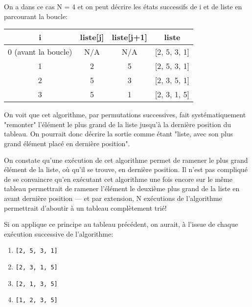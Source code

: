 \documentclass[12pt]{article}
\begin{document}
	\begin{MaReponse}
		On a dans ce cas N = 4 et on peut décrire les états successifs de i et de liste en parcourant la boucle:
		\begin{center}
			\begin{tabular}{|c|c|c|c|}
				\hline
				\textbf{i}&\textbf{liste[j]}&\textbf{liste[j+1]}&\textbf{liste}\\
				\hline
				0 (avant la boucle)&N/A&N/A&[2, 5, 3, 1]\\
				\hline
				1&2&5&[2, 5, 3, 1]\\
				\hline
				2&5&3&[2, 3, 5, 1]\\
				\hline
				3&5&1&[2, 3, 1, 5]\\
				\hline
			\end{tabular}
		\end{center}
	\end{MaReponse}
		
	\begin{MaReponse}
		On voit que cet algorithme, par permutations successives, fait systématiquement "remonter" l'élément le plus grand de la liste jusqu'à la dernière position du tableau. On pourrait donc décrire la sortie comme étant "liste, avec son plus grand élément placé en dernière position".
	\end{MaReponse}
	
	\begin{MaReponse}
		On constate qu'une exécution de cet algorithme permet de ramener le plus grand élément de la liste, où qu'il se trouve, en dernière position. Il n'est pas compliqué de se convaincre qu'en exécutant cet algorithme une fois encore sur le même tableau permettrait de ramener l'élément le deuxième plus grand de la liste en avant dernière position --- et par extension, N exécutions de l'algorithme permettrait d'aboutir à un tableau complètement trié!
		
		Si on applique ce principe au tableau précédent, on aurait, à l'issue de chaque exécution successive de l'algorithme:
		\begin{enumerate}
			\item \texttt{[2, 5, 3, 1]}
			\item \texttt{[2, 3, 1, 5]}
			\item \texttt{[2, 1, 3, 5]}
			\item \texttt{[1, 2, 3, 5]}
		\end{enumerate}
	\end{MaReponse}
	
\end{document}

